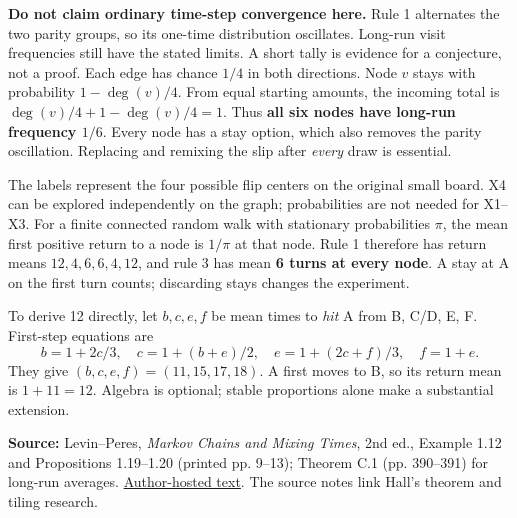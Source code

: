 \documentclass[11pt]{article}
\begin{document}
\textbf{Do not claim ordinary time-step convergence here.} Rule 1 alternates the two parity groups, so its one-time distribution oscillates. Long-run visit frequencies still have the stated limits. A short tally is evidence for a conjecture, not a proof.
Each edge has chance \(1/4\) in both directions. Node \(v\) stays with probability \(1-\deg(v)/4\). From equal starting amounts, the incoming total is \(\deg(v)/4+1-\deg(v)/4=1\). Thus \textbf{all six nodes have long-run frequency \(1/6\)}. Every node has a stay option, which also removes the parity oscillation. Replacing and remixing the slip after \emph{every} draw is essential.

The labels represent the four possible flip centers on the original small board. X4 can be explored independently on the graph; probabilities are not needed for X1--X3.
For a finite connected random walk with stationary probabilities \(\pi\), the mean first positive return to a node is \(1/\pi\) at that node. Rule 1 therefore has return means \(12,4,6,6,4,12\), and rule 3 has mean \textbf{6 turns at every node}. A stay at A on the first turn counts; discarding stays changes the experiment.

To derive 12 directly, let \(b,c,e,f\) be mean times to \emph{hit} A from B, C/D, E, F. First-step equations are
\[b=1+2c/3,\quad c=1+(b+e)/2,\quad e=1+(2c+f)/3,\quad f=1+e.\]
They give \((b,c,e,f)=(11,15,17,18)\). A first moves to B, so its return mean is \(1+11=12\). Algebra is optional; stable proportions alone make a substantial extension.

\textbf{Source:} Levin--Peres, \emph{Markov Chains and Mixing Times}, 2nd ed., Example 1.12 and Propositions 1.19--1.20 (printed pp. 9--13); Theorem C.1 (pp. 390--391) for long-run averages. \href{https://pages.uoregon.edu/dlevin/MARKOV/mcmt2e.pdf}{Author-hosted text}. The source notes link Hall's theorem and tiling research.
\end{document}
